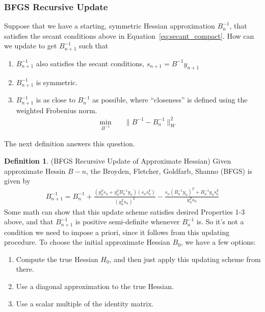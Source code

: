 \documentclass[12pt]{book}
\numberwithin{equation}{section} %
\theoremstyle{plain}
\theoremstyle{definition}
\newtheorem{defn}[thm]{Definition}
\theoremstyle{remark}
\begin{document}
\subsubsection{BFGS Recursive Update}

Suppose that we have a starting, symmetric Hessian approximation $B^{-1}_n$,
that satisfies the secant conditions above in
Equation~\ref{eq:secant_compact}. How can we update to get $B^{-1}_{n+1}$
such that
\begin{enumerate}
  \item $B^{-1}_{n+1}$ also satisfies the secant conditions,
    $s_{n+1} = B^{-1}y_{n+1}$
  \item $B^{-1}_{n+1}$ is symmetric.
  \item $B^{-1}_{n+1}$ is as close to $B^{-1}_n$ as possible, where
    ``closeness'' is defined using the weighted Frobenius norm.
    \begin{align*}
      \min_{B^{-1}} &\quad \lVert B^{-1} - B^{-1}_n\rVert^2_W
    \end{align*}
\end{enumerate}
The next definition answers this question.

\begin{defn}(BFGS Recursive Update of Approximate Hessian)
Given approximate Hessin $B-n$, the Broyden, Fletcher, Goldfarb, Shanno
(BFGS) is given by
\begin{align}
  B_{n+1}^{-1} = B^{-1}_n
  + \frac{(y_n^T s_n + y_n^T B^{-1}_n y_n)(s_n s_n^T)}{(y_n^T s_n)^2}
  - \frac{s_n (B^{-1}_n y_n)^T + B^{-1}_n y_n s_n^T}{y_n^T s_n}
  \label{eq:bfgs}
\end{align}
Some math can show that this update scheme satisfies desired Properties
1-3 above, and that $B^{-1}_{n+1}$ is positive semi-definite whenever
$B^{-1}_n$ is. So it's not a condition we need to impose a priori, since
it follows from this updating procedure.
To choose the initial approximate Hessian $B_0$, we have a few options:
\begin{enumerate}
  \item Compute the true Hessian $H_0$, and then just apply this
    updating scheme from there.
  \item Use a diagonal approximation to the true Hessian.
  \item Use a scalar multiple of the identity matrix.
\end{enumerate}
\end{defn}
\end{document}
